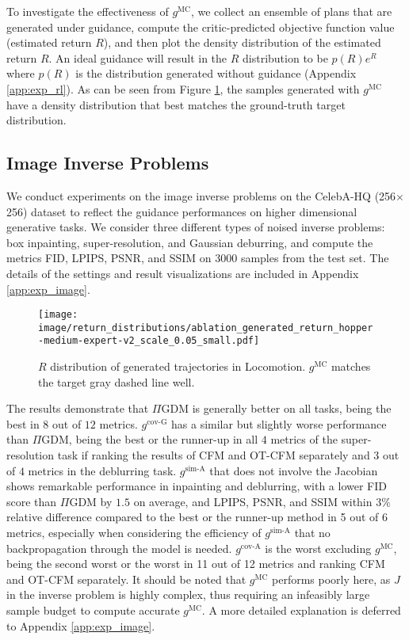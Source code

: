 To investigate the effectiveness of $g^{\text{MC}}$, we collect an ensemble of plans that are generated under guidance, compute the critic-predicted objective function value (estimated return $R$), and then plot the density distribution of the estimated return $R$. An ideal guidance will result in the $R$ distribution to be $p(R)e^{R}$ where $p(R)$ is the distribution generated without guidance (Appendix \ref{app:exp_rl}). As can be seen from Figure \ref{fig:rl_ablation_J_dist}, the samples generated with $g^{\text{MC}}$ have a density distribution that best matches the ground-truth target distribution. 

\subsection{Image Inverse Problems}

We conduct experiments on the image inverse problems on the CelebA-HQ (256$\times$256) dataset to reflect the guidance performances on higher dimensional generative tasks. We consider three different types of noised inverse problems: box inpainting, super-resolution, and Gaussian deburring, and compute the metrics FID, LPIPS, PSNR, and SSIM on 3000 samples from the test set. The details of the settings and result visualizations are included in Appendix \ref{app:exp_image}. 

\begin{figure}[!htb]
    \centering
    \texttt{[image: image/return\_distributions/ablation\_generated\_return\_hopper-medium-expert-v2\_scale\_0.05\_small.pdf]}
    \vskip -0.12in
    \caption{$R$ distribution of generated trajectories in Locomotion. $g^{\text{MC}}$ matches the target gray dashed line well.}
    \label{fig:rl_ablation_J_dist}
    \vspace{-16pt}
\end{figure}

The results demonstrate that $\Pi$GDM is generally better on all tasks, being the best in $8$ out of $12$ metrics. $g^{\text{cov-G}}$ has a similar but slightly worse performance than $\Pi$GDM, being the best or the runner-up in all $4$ metrics of the super-resolution task if ranking the results of CFM and OT-CFM separately and $3$ out of $4$ metrics in the deblurring task. $g^{\text{sim-A}}$ that does not involve the Jacobian shows remarkable performance in inpainting and deblurring, with a lower FID score than $\Pi$GDM by $1.5$ on average, and LPIPS, PSNR, and SSIM within $3\%$ relative difference compared to the best or the runner-up method in 5 out of 6 metrics, especially when considering the efficiency of $g^{\text{sim-A}}$ that no backpropagation through the model is needed. $g^{\text{cov-A}}$ is the worst excluding $g^{\text{MC}}$, being the second worst or the worst in 11 out of 12 metrics and ranking CFM and OT-CFM separately. It should be noted that $g^{\text{MC}}$ performs poorly here, as $J$ in the inverse problem is highly complex, thus requiring an infeasibly large sample budget to compute accurate $g^{\text{MC}}$. A more detailed explanation is deferred to Appendix \ref{app:exp_image}. 




